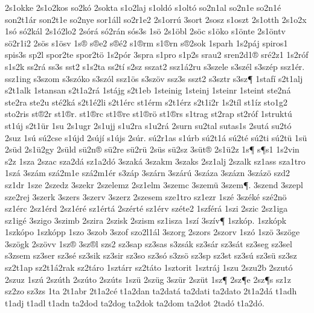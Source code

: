{2s1okke
2s1o2kos
so2k^^f3
2sokta
s1o2laj
s1old^^f3
s1olt^^f3
so2n1al
so2n1e
so2n1^^e9
son2t1^^e1r
son2t1e
so2nye
sor1^^e1ll
so2r1e2
2s1orr^^fa
3sort
2sosz
s1oszt
2s1otth
2s1o2x
1s^^f3
s^^f32k^^e1l
2s1^^f32lo2
2s^^f3r^^e1
s^^f32r^^e1n
s^^f3s3s
1s^^f6
2s1^^f6bl
2s^^f6c
s1^^f6ko
s1^^f6nte
2s1^^f6ntv
s^^f62r1i2
2s^^f6s
s1^^f6sv
1s^^ae
s^^aee2
s^^ae^^e92
s1^^aerm
s1^^aern
s^^ae2sok
1sparh
1s2p^^e1j
spiros1
spis3s
sp2l
spor2te
spor2t^^f6
1s2p^^f3r
3spra
s1pro
s1p2s
srau2
sren2d1^^ae
sr^^e92z1
1s2r^^f3f
s1s2k
ss2r^^e1
ss3s
sst2
s1s2ta
ss2t^^ed
s2sz
sszat2
ssz1^^e12ru
s3szele
s3sz^^e9l
s3sz^^e9p
ssz1^^e9r.
ssz1ing
s3szom
s3sz^^f3ko
s3sz^^f3l
ssz1^^f6s
s3sz^^f6v
ssz3s
sszt2
s3sztr
s3sz^^b6
1staf^^ed
s2t1alj
s2t1alk
1stansan
s2t1a2r^^e1
1st^^e1jg
s2t1eb
1steinig
1steinj
1steinr
1steint
ste2n^^e1
ste2ra
ste2u
st^^e92k^^e1
s2t1^^e92li
s2t1^^e9rc
st1^^e9rm
s2t1^^e9rz
s2t1i2r
1s2t^^edl
st1^^edz
sto1g2
sto2ris
st^^ae2r
st1^^aer.
st1^^aerc
st1^^aere
st1^^aer^^f6
st1^^aers
s1trag
st2rap
st2r^^f3f
1strukt^^fa
st1^^faj
s2t1^^fcr
1su
2s1ugr
2s1ujj
s1u2ra
s1u2r^^e1
2surn
su2tal
sutas1s
2sut^^e1
su2t^^f3
2suz
1s^^fa
s^^fa2cse
s1^^fajd
2s^^faj^^ed
s1^^fajs
2s^^far.
s^^fa2r1as
s1^^farb
s^^fa2t1^^e1
s^^fa2t^^e9
s^^fa2ti
s^^fa2t^^fc
1s^^fc
2s^^fcd
2s1^^fc2gy
2s^^fcld
s^^fc2n^^ae
s^^fc2re
s^^fc2r^^fc
2s^^fcs
s^^fc2sz
3s^^fct^^ae
2s1^^fc2z
1s^^b6
s^^b6s1
1s2vin
s2z
1sza
2szac
sza2d^^e1
sz1a2d^^f3
3szak^^e1
3szakm
3szaks
2sz1alj
2szalk
sz1ass
sza1tro
1sz^^e1
3sz^^e1m
sz^^e12m1e
sz^^e12m1^^e9r
s3z^^e1p
3sz^^e1rn
3sz^^e1r^^fa
3sz^^e1za
3sz^^e1zn
3sz^^e1z^^f6
szd2
sz1dr
1sze
2szedz
3szekr
2szelemz
2sz1elm
3szemc
3szem^^fc
3szem^^b6.
3szend
3szepl
sze2rej
3szerk
3szers
3szerv
3szerz
2szesem
sze1tro
sz1ezr
1sz^^e9
3sz^^e9k^^e9
sz^^e92n^^f6
sz1^^e9rc
2sz1^^e9rd
2sz1^^e9r^^e9
sz1^^e9rt^^e1
2sz^^e9rt^^e9
sz1^^e9rv
sz^^e9te2
1szf^^e9r^^e1
1szi
2szic
2sz1iga
sz1ig^^e9
3szigo
3szimb
2szira
2szisk
2szism
sz1isza
1sz^^ed
3sz^^edv^^b6
1szk^^f3p.
1szk^^f3pk
1szk^^f3po
1szk^^f3pp
1szo
3szob
3szof
szo2l1^^e1l
3szorg
2szors
2szorv
1sz^^f3
1sz^^f6
3sz^^f6ge
3sz^^f6gk
2sz^^f6vv
1sz^^ae
3sz^^ael
szs2
sz3sap
sz3sas
s3zs^^e1k
sz3s^^e1r
sz3s^^e1t
sz3seg
sz3sel
s3zsem
sz3ser
sz3s^^e9
sz3sik
sz3sir
sz3so
sz3s^^f3
s3zs^^f6
sz3sp
sz3st
sz3s^^fa
sz3s^^fc
sz3sz
sz2t1ap
sz2t1^^e12rak
sz2t^^e1ro
1szt^^e1rr
sz2t^^e1to
1sztorit
1sztr^^e1j
1szu
2szu2b
2szut^^f3
2szuz
1sz^^fa
2sz^^fath
2sz^^fato
2sz^^fats
1sz^^fc
2sz^^fcg
3sz^^fcr
2sz^^fct
1sz^^b6
2sz^^b6e
2sz^^b6s
sz1z
sz2zo
sz3zs
1ta
2t1abr
2t1a2c^^e9
t1a2dan
ta2dat^^e1
ta2dati
ta2dato
2t1a2d^^e1
t1adh
t1adj
t1adl
t1adn
ta2dod
ta2dog
ta2dok
ta2dom
ta2dot
2tad^^f3
t1a2d^^f3.
}
